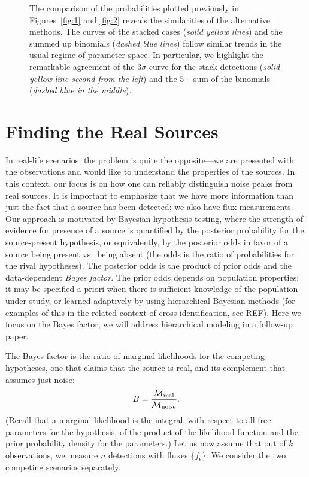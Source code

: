 \documentclass[twocolumn]{emulateapj}
\newcommand{\eind}{\epsilon}  %
\newcommand{\mlike}{\mathcal{M}}  %
\begin{document}
\begin{figure}[t]
\caption{The comparison of the probabilities plotted previously in Figures~\ref{fig:1} and \ref{fig:2} reveals the similarities of the alternative methods. The curves of the stacked cases ({\it{}solid yellow lines}) and the summed up binomials ({\it{}dashed blue lines}) follow similar trends in the usual regime of parameter space. In particular, we highlight the remarkable agreement of the 3$\sigma$ curve for the stack detections ({\it{}solid yellow line second from the left}) and the 5+ sum of the binomials ({\it{}dashed blue in the middle}).}
\label{fig:3}
\end{figure}


\section{Finding the Real Sources}
\noindent
%
In real-life scenarios, the problem is quite the opposite---we are presented with the observations and would like to understand the properties of the sources. 
In this context, our focus is on how one can reliably distinguish noise peaks from real sources. 
It is important to emphasize that we have more information than just the fact that a source has been detected; we also have flux measurements. 
Our approach is motivated by Bayesian hypothesis testing, where the strength of evidence for presence of a source is quantified by the posterior probability for the source-present hypothesis, or equivalently, by the posterior odds in favor of a source being present vs.\ being absent (the odds is the ratio of probabilities for the rival hypotheses).
The posterior odds is the product of prior odds and the data-dependent \emph{Bayes factor}.
The prior odds depends on population properties; it may be specified a priori when there is sufficient knowledge of the population under study, or learned adaptively by using hierarchical Bayesian methods (for examples of this in the related context of cross-identification, see REF).
Here we focus on the Bayes factor; we will address hierarchical modeling in a follow-up paper.

The Bayes factor is the ratio of marginal likelihoods for the competing hypotheses, one that claims that the source is real, and its complement that assumes just noise:
%
\begin{equation} \label{eq:Bfac}
B = \frac{\mlike_{\rm{}real}}{\mlike_{\rm{}noise}} .
\end{equation}
%
(Recall that a marginal likelihood is the integral, with respect to all free parameters for the hypothesis, of the product of the likelihood function and the prior probability density for the parameters.)
Let us now assume that out of $k$ observations, we measure $n$ detections with fluxes $\{f_\eind\}$. We consider the two competing scenarios separately.
\end{document}
